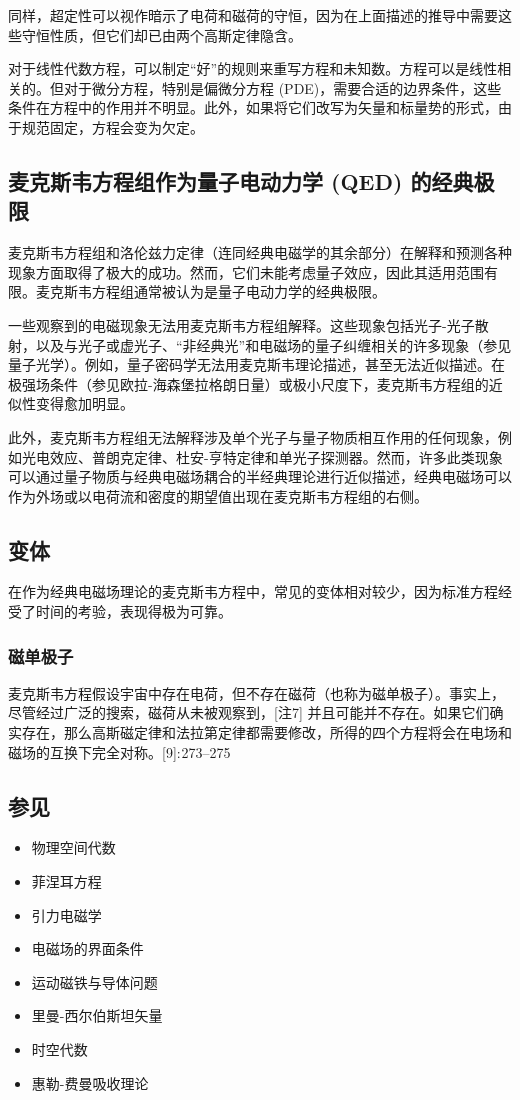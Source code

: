 同样，超定性可以视作暗示了电荷和磁荷的守恒，因为在上面描述的推导中需要这些守恒性质，但它们却已由两个高斯定律隐含。

对于线性代数方程，可以制定“好”的规则来重写方程和未知数。方程可以是线性相关的。但对于微分方程，特别是偏微分方程 (PDE)，需要合适的边界条件，这些条件在方程中的作用并不明显。此外，如果将它们改写为矢量和标量势的形式，由于规范固定，方程会变为欠定。
\subsection{麦克斯韦方程组作为量子电动力学 (QED) 的经典极限}
麦克斯韦方程组和洛伦兹力定律（连同经典电磁学的其余部分）在解释和预测各种现象方面取得了极大的成功。然而，它们未能考虑量子效应，因此其适用范围有限。麦克斯韦方程组通常被认为是量子电动力学的经典极限。

一些观察到的电磁现象无法用麦克斯韦方程组解释。这些现象包括光子-光子散射，以及与光子或虚光子、“非经典光”和电磁场的量子纠缠相关的许多现象（参见量子光学）。例如，量子密码学无法用麦克斯韦理论描述，甚至无法近似描述。在极强场条件（参见欧拉-海森堡拉格朗日量）或极小尺度下，麦克斯韦方程组的近似性变得愈加明显。

此外，麦克斯韦方程组无法解释涉及单个光子与量子物质相互作用的任何现象，例如光电效应、普朗克定律、杜安-亨特定律和单光子探测器。然而，许多此类现象可以通过量子物质与经典电磁场耦合的半经典理论进行近似描述，经典电磁场可以作为外场或以电荷流和密度的期望值出现在麦克斯韦方程组的右侧。
\subsection{变体}
在作为经典电磁场理论的麦克斯韦方程中，常见的变体相对较少，因为标准方程经受了时间的考验，表现得极为可靠。
\subsubsection{磁单极子}
麦克斯韦方程假设宇宙中存在电荷，但不存在磁荷（也称为磁单极子）。事实上，尽管经过广泛的搜索，磁荷从未被观察到，[注7] 并且可能并不存在。如果它们确实存在，那么高斯磁定律和法拉第定律都需要修改，所得的四个方程将会在电场和磁场的互换下完全对称。[9]: 273–275
\subsection{参见}
\begin{itemize}
\item 物理空间代数
\item 菲涅耳方程
\item 引力电磁学
\item 电磁场的界面条件
\item 运动磁铁与导体问题
\item 里曼-西尔伯斯坦矢量
\item 时空代数
\item 惠勒-费曼吸收理论
\end{itemize}

